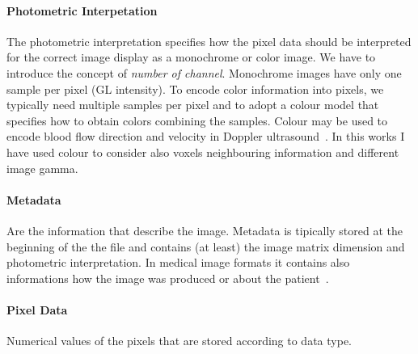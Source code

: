 \documentclass{standalone}
\begin{document}
	\paragraph{Photometric Interpetation} The photometric interpretation specifies how the pixel data should be interpreted for the correct image display as a monochrome or color image. We have to introduce the concept of \emph{number of channel}. Monochrome images have only one sample per pixel (GL intensity). To encode color information into pixels, we typically need multiple samples per pixel and to adopt a colour model that specifies how to obtain colors combining the samples. Colour may be used to encode blood flow direction and velocity in Doppler ultrasound~\cite{ART:Larobina}. In this works I have used colour to consider also voxels neighbouring information and different image gamma. 
	
	\paragraph{Metadata} Are the information that describe the image. Metadata is tipically stored at the beginning of the the file and contains (at least) the image matrix dimension and photometric interpretation. In medical image formats it contains also informations how the image was produced or about the patient~\cite{ART:Larobina}.
	
	\paragraph{Pixel Data} Numerical values of the pixels that are stored according to data type.
			
\end{document}
